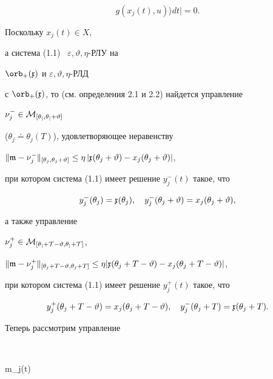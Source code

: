 \begin{pf}
\begin{equation}
g(x_j(t),u)\rangle dt\bigg|=0.


\end{equation}





Поскольку $x_j(t)\in X$,


а система (1.1) \ $\varepsilon,\vartheta,\eta$-РЛУ на


$\orb_+(\frak x)$ и $\varepsilon,\vartheta,\eta$-РЛД


с $\orb_+(\frak x)$, то (см. определения 2.1 и 2.2) найдется управление


$\nu_j^-\in\cal M_{[\theta_j,\theta_j+\vartheta]}$


($\theta_{j}\doteq\theta_{j}(T)$), удовлетворяющее неравенству


$\|\frak m-\nu_j^-\|_{[\theta_j,\theta_j


+\vartheta]}\le\eta\,|\frak x(\theta_j


+\vartheta)-x_j(\theta_j+\vartheta)|$,


при котором система (1.1) имеет решение $y_j^-(t)$ такое, что


\begin{equation}


y_j^-(\theta_j)={\frak x}(\theta_j),\quad


y_j^-(\theta_j+\vartheta)=x_j(\theta_j+\vartheta),


\end{equation}


а также управление


$\nu_j^+\in\cal M_{[\theta_j+T-\vartheta,\theta_j+T]}$,


$\|\frak m-\nu_j^+\|_{[\theta_j+T-\vartheta,\theta_j+T]}


\le\eta|\frak x(\theta_j+T-\vartheta)-x_j(\theta_j+T-\vartheta)|$,


при котором система (1.1) имеет решение $y_j^+(t)$ такое, что


\begin{equation}


y_j^+(\theta_j+T-\vartheta)=x_j(\theta_j+T-\vartheta),\quad


y_j^-(\theta_j+T)=\frak x(\theta_j+T).


\end{equation}





Теперь рассмотрим управление


$$


{\frak m}_j(t)\doteq



\end{pf}
